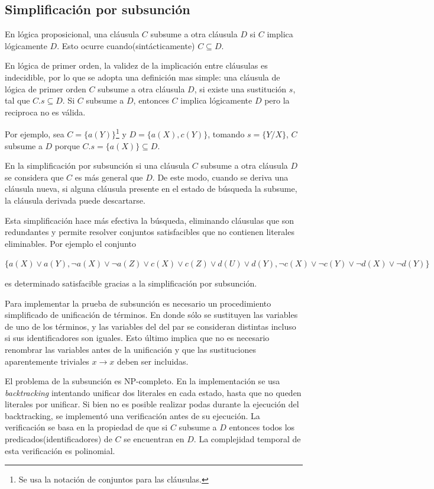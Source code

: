 \documentclass[a4paper,12pt]{article}
\begin{document}
\subsection{Simplificación por subsunción}
En lógica proposicional, una cláusula $C$ subsume a otra cláusula $D$ si $C$ implica lógicamente
$D$. Esto ocurre cuando(sintácticamente) $C\subseteq D$.

En lógica de primer orden, la validez de la implicación entre cláusulas es indecidible\cite{PracticalLogic},
por lo que se adopta una definición mas simple: una cláusula de lógica de primer orden $C$ subsume a otra
cláusula $D$, si existe una sustitución $s$, tal que $C.s\subseteq D$. Si $C$ subsume a $D$, 
entonces $C$ implica lógicamente $D$ pero la reciproca no es válida.

Por ejemplo, sea $C=\{a(Y)\}$\footnote{Se usa la notación de conjuntos para las cláusulas.} y $D=\{a(X),c(Y)\}$, 
tomando $s=\{Y/X\}$, $C$ subsume a $D$ porque $C.s=\{a(X)\}\subseteq D$.

En la simplificación por subsunción si una cláusula $C$ subsume a otra cláusula $D$ se considera
que $C$ es más general que $D$. De este modo, cuando se deriva una cláusula nueva,
si alguna cláusula presente en el estado de búsqueda la subsume, la cláusula derivada
puede descartarse.

Esta simplificación hace más efectiva la búsqueda, eliminando cláusulas que son redundantes y
permite resolver conjuntos satisfacibles que no contienen literales eliminables. Por ejemplo el
conjunto
\begin{center}
$\{a(X) \lor  a(Y),\lnot a(X) \lor  \lnot a(Z) \lor  c(X) \lor  c(Z) \lor  d(U) \lor  d(Y),
\lnot c(X) \lor  \lnot c(Y) \lor  \lnot d(X) \lor  \lnot d(Y)\}$
\end{center}
es determinado satisfacible gracias a la simplificación por subsunción.

Para implementar la prueba de subsunción es necesario un procedimiento simplificado
de unificación de términos. En donde sólo se sustituyen las variables de uno de los términos,
y las variables del del par se consideran distintas incluso si sus identificadores son iguales.
Esto último implica que no es necesario renombrar las variables antes de la unificación y que las sustituciones
aparentemente triviales $x \rightarrow x$ deben ser incluidas.

El problema de la subsunción es NP-completo. En la implementación se usa \emph{backtracking}
intentando unificar dos literales en cada estado, hasta que no queden literales por unificar.
Si bien no es posible realizar podas durante la ejecución del backtracking, se implementó
una verificación antes de su ejecución.
La verificación se basa en la propiedad de que si $C$ subsume a $D$ entonces todos los predicados(identificadores)
de $C$ se encuentran en $D$. La complejidad temporal de esta verificación es polinomial.
\end{document}
